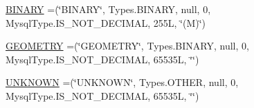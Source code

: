 \begin{DoxyCompactItemize}
\item 
\mbox{\hyperlink{enumcom_1_1mysql_1_1cj_1_1_mysql_type_ac5a30a348c2d7efaefa81040b53513a7}{B\+I\+N\+A\+RY}} =(\char`\"{}B\+I\+N\+A\+RY\char`\"{}, Types.\+B\+I\+N\+A\+RY, null, 0, Mysql\+Type.\+I\+S\+\_\+\+N\+O\+T\+\_\+\+D\+E\+C\+I\+M\+AL, 255\+L, \char`\"{}(\+M)\char`\"{})
\item 
\mbox{\hyperlink{enumcom_1_1mysql_1_1cj_1_1_mysql_type_aa49cdfb7c144fe5dcf23fe5c31bfe82d}{G\+E\+O\+M\+E\+T\+RY}} =(\char`\"{}G\+E\+O\+M\+E\+T\+RY\char`\"{}, Types.\+B\+I\+N\+A\+RY, null, 0, Mysql\+Type.\+I\+S\+\_\+\+N\+O\+T\+\_\+\+D\+E\+C\+I\+M\+AL, 65535\+L, \char`\"{}\char`\"{})
\item 
\mbox{\hyperlink{enumcom_1_1mysql_1_1cj_1_1_mysql_type_a5c1f5a756ee4ef0468c1782e0f2bec65}{U\+N\+K\+N\+O\+WN}} =(\char`\"{}U\+N\+K\+N\+O\+WN\char`\"{}, Types.\+O\+T\+H\+ER, null, 0, Mysql\+Type.\+I\+S\+\_\+\+N\+O\+T\+\_\+\+D\+E\+C\+I\+M\+AL, 65535\+L, \char`\"{}\char`\"{})
\end{DoxyCompactItemize}
